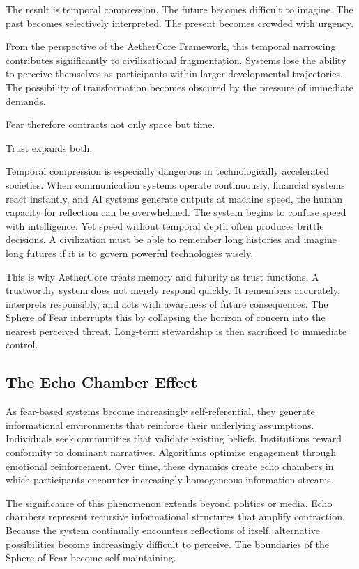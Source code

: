 \documentclass[12pt]{article}
\begin{document}
The result is temporal compression. The future becomes difficult to imagine. The past becomes selectively interpreted. The present becomes crowded with urgency.

From the perspective of the AetherCore Framework, this temporal narrowing contributes significantly to civilizational fragmentation. Systems lose the ability to perceive themselves as participants within larger developmental trajectories. The possibility of transformation becomes obscured by the pressure of immediate demands.

Fear therefore contracts not only space but time.

Trust expands both.

Temporal compression is especially dangerous in technologically accelerated societies. When communication systems operate continuously, financial systems react instantly, and AI systems generate outputs at machine speed, the human capacity for reflection can be overwhelmed. The system begins to confuse speed with intelligence. Yet speed without temporal depth often produces brittle decisions. A civilization must be able to remember long histories and imagine long futures if it is to govern powerful technologies wisely.

This is why AetherCore treats memory and futurity as trust functions. A trustworthy system does not merely respond quickly. It remembers accurately, interprets responsibly, and acts with awareness of future consequences. The Sphere of Fear interrupts this by collapsing the horizon of concern into the nearest perceived threat. Long-term stewardship is then sacrificed to immediate control.

\subsection{The Echo Chamber Effect}

As fear-based systems become increasingly self-referential, they generate informational environments that reinforce their underlying assumptions. Individuals seek communities that validate existing beliefs. Institutions reward conformity to dominant narratives. Algorithms optimize engagement through emotional reinforcement. Over time, these dynamics create echo chambers in which participants encounter increasingly homogeneous information streams.

The significance of this phenomenon extends beyond politics or media. Echo chambers represent recursive informational structures that amplify contraction. Because the system continually encounters reflections of itself, alternative possibilities become increasingly difficult to perceive. The boundaries of the Sphere of Fear become self-maintaining.
\end{document}
